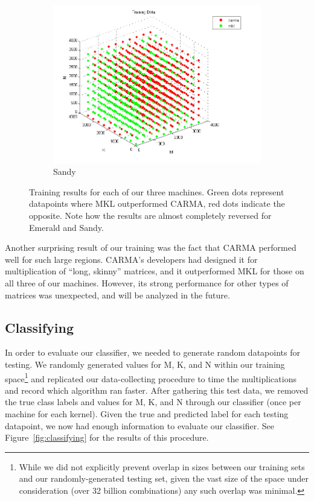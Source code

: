 \begin{figure}[t]
        \begin{subfigure}[t]{0.33\textwidth}
            \includegraphics[width=\textwidth]{figures/sandy_train.png}
            \caption{Sandy}
            \label{f:train_sandy}
        \end{subfigure}
        \caption{Training results for each of our three machines. Green dots represent datapoints where MKL outperformed CARMA, red dots indicate the opposite. Note how the results are almost completely reversed for Emerald and Sandy.}
    \label{fig:training}
\end{figure}

Another surprising result of our training was the fact that CARMA performed well for such large regions.
CARMA's developers had designed it for multiplication of ``long, skinny'' matrices, and it outperformed MKL for those on all three of our machines.
However, its strong performance for other types of matrices was unexpected, and will be analyzed in the future.

\subsection{Classifying}
\label{s:classifying}
In order to evaluate our classifier, we needed to generate random datapoints for testing.
We randomly generated values for M, K, and N within our training space\footnote{While we did not explicitly prevent overlap in sizes between our training sets and our randomly-generated testing set, given the vast size of the space under consideration (over 32 billion combinations) any such overlap was minimal.} and replicated our data-collecting procedure to time the multiplications and record which algorithm ran faster.
After gathering this test data, we removed the true class labels and  values for M, K, and N through our classifier (once per machine for each kernel).
Given the true and predicted label for each testing datapoint, we now had enough information to evaluate our classifier.
See Figure~\ref{fig:classifying} for the results of this procedure.

